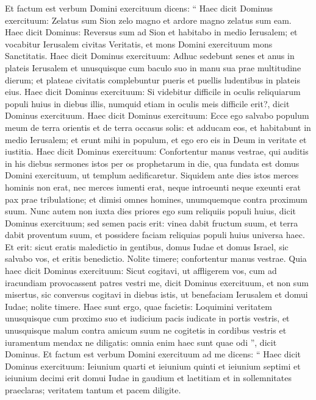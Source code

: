 \begin{biblechapter}
\begin{biblechapter}
\begin{biblechapter}
\begin{biblechapter}
\begin{biblechapter}
\begin{biblechapter}
\begin{biblechapter}
\begin{biblechapter}
\verse Et factum est verbum Domini exercituum dicens: 
\verse “ Haec dicit Dominus exercituum:
 Zelatus sum Sion zelo magno
 et ardore magno zelatus sum eam.
 \verse Haec dicit Dominus: Reversus sum ad Sion et habitabo in medio Ierusalem; et vocabitur Ierusalem civitas Veritatis, et mons Domini exercituum mons Sanctitatis.
 \verse Haec dicit Dominus exercituum: Adhuc sedebunt senes et anus in plateis Ierusalem et unusquisque cum baculo suo in manu sua prae multitudine dierum; 
 \verse et plateae civitatis complebuntur pueris et puellis ludentibus in plateis eius.
 \verse Haec dicit Dominus exercituum: Si videbitur difficile in oculis reliquiarum populi huius in diebus illis, numquid etiam in oculis meis difficile erit?, dicit Dominus exercituum.
 \verse Haec dicit Dominus exercituum:
 Ecce ego salvabo populum meum de terra orientis
 et de terra occasus solis:
 \verse et adducam eos,
 et habitabunt in medio Ierusalem;
 et erunt mihi in populum,
 et ego ero eis in Deum
 in veritate et iustitia.
 \verse Haec dicit Dominus exercituum: Confortentur manus vestrae, qui auditis in his diebus sermones istos per os prophetarum in die, qua fundata est domus Domini exercituum, ut templum aedificaretur.
 \verse Siquidem ante dies istos
 merces hominis non erat,
 nec merces iumenti erat,
 neque introeunti neque exeunti
 erat pax prae tribulatione;
 et dimisi omnes homines,
 unumquemque contra proximum suum.
 \verse Nunc autem non iuxta dies priores ego sum
 reliquiis populi huius,
 dicit Dominus exercituum;
 \verse sed semen pacis erit:
 vinea dabit fructum suum,
 et terra dabit proventum suum,
 et possidere faciam
 reliquias populi huius
 universa haec.
 \verse Et erit: sicut eratis maledictio in gentibus, domus Iudae et domus Israel, sic salvabo vos, et eritis benedictio. Nolite timere; confortentur manus vestrae. 
\verse Quia haec dicit Dominus exercituum: Sicut cogitavi, ut affligerem vos, cum ad iracundiam provocassent patres vestri me, dicit Dominus exercituum, 
\verse et non sum misertus, sic conversus cogitavi in diebus istis, ut benefaciam Ierusalem et domui Iudae; nolite timere.
 \verse Haec sunt ergo, quae facietis: Loquimini veritatem unusquisque cum proximo suo et iudicium pacis iudicate in portis vestris, 
\verse et unusquisque malum contra amicum suum ne cogitetis in cordibus vestris et iuramentum mendax ne diligatis: omnia enim haec sunt quae odi ”, dicit Dominus.
 \verse Et factum est verbum Domini exercituum ad me dicens: 
\verse “ Haec dicit Dominus exercituum: Ieiunium quarti et ieiunium quinti et ieiunium septimi et ieiunium decimi erit domui Iudae in gaudium et laetitiam et in sollemnitates praeclaras; veritatem tantum et pacem diligite. 

\end{biblechapter}
\end{biblechapter}
\end{biblechapter}
\end{biblechapter}
\end{biblechapter}
\end{biblechapter}
\end{biblechapter}
\end{biblechapter}
